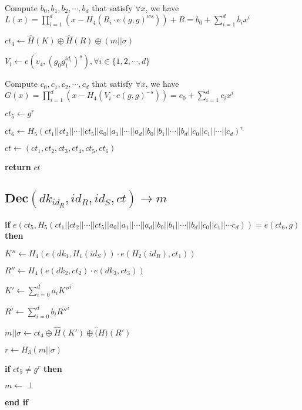 \documentclass[a4paper]{article}
\begin{document}
Compute $b_0, b_1, b_2, \cdots, b_d$ that satisfy $\forall x$, we have $L(x) = \prod\limits_{i = 1}^d (x - H_4(R_i \cdot e(g, g)^{ws})) + R = b_0 + \sum\limits_{i = 1}^d b_i x^i$

$\textit{ct}_4 \gets \hat{H}(K) \oplus \hat{H}(R) \oplus (m || \sigma)$

$V_i \gets e(v_4, (g_0 g_1^{\textit{id}_i})^s), \forall i \in \{1, 2, \cdots, d\}$

Compute $c_0, c_1, c_2, \cdots, c_d$ that satisfy $\forall x$, we have $G(x) = \prod\limits_{i = 1}^d (x - H_4(V_i \cdot e(g, g)^{-s})) = c_0 + \sum\limits_{i = 1}^d c_i x^i$

$\textit{ct}_5 \gets g^r$

$\textit{ct}_6 \gets H_5(\textit{ct}_1 || \textit{ct}_2 || \cdots || \textit{ct}_5 || a_0 || a_1 || \cdots || a_d || b_0 || b_1 || \cdots || b_d || c_0 || c_1 || \cdots || c_d)^r$

$\textit{ct} \gets (\textit{ct}_1, \textit{ct}_2, \textit{ct}_3, \textit{ct}_4, \textit{ct}_5, \textit{ct}_6)$

\textbf{return} $\textit{ct}$

\subsection{$\textbf{Dec}(\textit{dk}_{\textit{id}_R}, \textit{id}_R, \textit{id}_S, \textit{ct}) \rightarrow m$}

\textbf{if} $e(\textit{ct}_5, H_5(\textit{ct}_1 || \textit{ct}_2 || \cdots || \textit{ct}_5 || a_0 || a_1 || \cdots || a_d || b_0 || b_1 || \cdots || b_d || c_0 || c_1 || \cdots c_d)) = e(\textit{ct}_6, g)$ \textbf{then}

\quad$K'' \gets H_4(e(\textit{dk}_1, H_1(\textit{id}_S)) \cdot e(H_2(\textit{id}_R), \textit{ct}_1))$

\quad$R'' \gets H_4(e(\textit{dk}_2, \textit{ct}_2) \cdot e(\textit{dk}_3, \textit{ct}_3))$

\quad$K' \gets \sum\limits_{i = 0}^d a_i K''^i$

\quad$R' \gets \sum\limits_{i = 0}^d b_i R''^i$

\quad$m || \sigma \gets \textit{ct}_4 \oplus \hat{H}(K') \oplus \hat(H)(R')$

\quad$r \gets H_3(m || \sigma)$

\quad\textbf{if} $\textit{ct}_5 \neq g^r$ \textbf{then}

\quad\quad$m \gets \perp$

\quad\textbf{end if}
\end{document}
